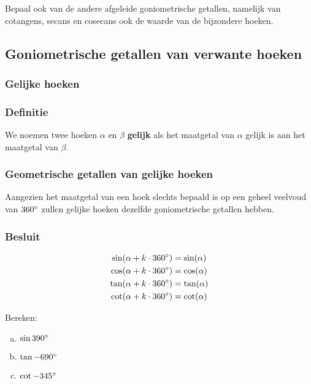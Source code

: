 \documentclass[twoside,a4paper,12pt]{article}
\begin{document}
\begin{oefening}
Bepaal ook van de andere afgeleide goniometrische getallen, namelijk van cotangens, secans en cosecans ook de waarde van de bijzondere hoeken.
\end{oefening}

\subsection{Goniometrische getallen van verwante hoeken}

\subsubsection{Gelijke hoeken}

\subsubsection*{Definitie}
We noemen twee hoeken $\alpha$ en $\beta$ \textbf{gelijk} als het maatgetal van $\alpha$ gelijk is aan het maatgetal van $\beta$.

\subsubsection*{Geometrische getallen van gelijke hoeken}
Aangezien het maatgetal van een hoek slechts bepaald is op een geheel veelvoud van $360^\circ$ zullen gelijke hoeken dezelfde goniometrische getallen hebben.

\subsubsection*{Besluit}
\begin{align*}
\sin(\alpha+k\cdot 360^\circ)&=\sin(\alpha)\\
\cos(\alpha+k\cdot 360^\circ)&=\cos(\alpha)\\
\tan(\alpha+k\cdot 360^\circ)&=\tan(\alpha)\\
\cot(\alpha+k\cdot 360^\circ)&=\cot(\alpha)\\
\end{align*}

\begin{oefening}
Bereken:
\begin{enumerate}[(a)]
  \itemsep0.5em
  \item $\sin 390^\circ$
  \item $\tan -690^\circ$
  \item $\cot -345^\circ$
\end{enumerate}
\end{oefening}
\end{document}
